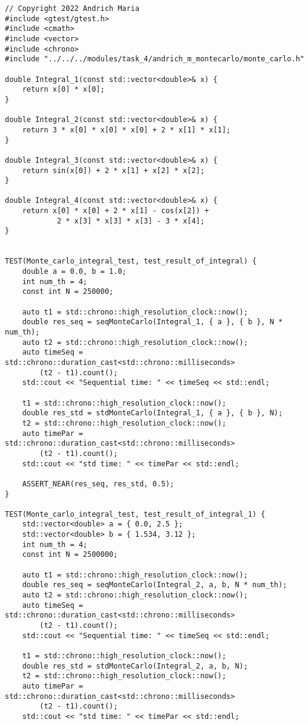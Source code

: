 \documentclass{report}
\begin{document}
\begin{lstlisting}
// Copyright 2022 Andrich Maria
#include <gtest/gtest.h>
#include <cmath>
#include <vector>
#include <chrono>
#include "../../../modules/task_4/andrich_m_montecarlo/monte_carlo.h"

double Integral_1(const std::vector<double>& x) {
    return x[0] * x[0];
}

double Integral_2(const std::vector<double>& x) {
    return 3 * x[0] * x[0] * x[0] + 2 * x[1] * x[1];
}

double Integral_3(const std::vector<double>& x) {
    return sin(x[0]) + 2 * x[1] + x[2] * x[2];
}

double Integral_4(const std::vector<double>& x) {
    return x[0] * x[0] + 2 * x[1] - cos(x[2]) +
            2 * x[3] * x[3] * x[3] - 3 * x[4];
}


TEST(Monte_carlo_integral_test, test_result_of_integral) {
    double a = 0.0, b = 1.0;
    int num_th = 4;
    const int N = 250000;

    auto t1 = std::chrono::high_resolution_clock::now();
    double res_seq = seqMonteCarlo(Integral_1, { a }, { b }, N * num_th);
    auto t2 = std::chrono::high_resolution_clock::now();
    auto timeSeq = std::chrono::duration_cast<std::chrono::milliseconds>
        (t2 - t1).count();
    std::cout << "Sequential time: " << timeSeq << std::endl;

    t1 = std::chrono::high_resolution_clock::now();
    double res_std = stdMonteCarlo(Integral_1, { a }, { b }, N);
    t2 = std::chrono::high_resolution_clock::now();
    auto timePar = std::chrono::duration_cast<std::chrono::milliseconds>
        (t2 - t1).count();
    std::cout << "std time: " << timePar << std::endl;

    ASSERT_NEAR(res_seq, res_std, 0.5);
}

TEST(Monte_carlo_integral_test, test_result_of_integral_1) {
    std::vector<double> a = { 0.0, 2.5 };
    std::vector<double> b = { 1.534, 3.12 };
    int num_th = 4;
    const int N = 2500000;

    auto t1 = std::chrono::high_resolution_clock::now();
    double res_seq = seqMonteCarlo(Integral_2, a, b, N * num_th);
    auto t2 = std::chrono::high_resolution_clock::now();
    auto timeSeq = std::chrono::duration_cast<std::chrono::milliseconds>
        (t2 - t1).count();
    std::cout << "Sequential time: " << timeSeq << std::endl;

    t1 = std::chrono::high_resolution_clock::now();
    double res_std = stdMonteCarlo(Integral_2, a, b, N);
    t2 = std::chrono::high_resolution_clock::now();
    auto timePar = std::chrono::duration_cast<std::chrono::milliseconds>
        (t2 - t1).count();
    std::cout << "std time: " << timePar << std::endl;


\end{lstlisting}
\end{document}
